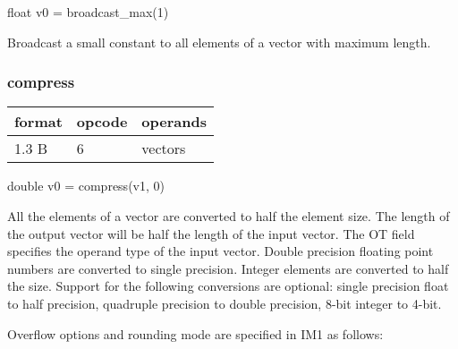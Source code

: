 \documentclass[forwardcom.tex]{subfiles}
\begin{document}
float v0 = broadcast\_max(1)
\vspace{2mm}

Broadcast a small constant to all elements of a vector with maximum length.
\vspace{2mm}


\subsubsection{compress}
\label{table:compressInstruction}
\begin{tabular}{|p{12mm}|p{12mm}|p{110mm}|}
\hline
\bfseries format & \bfseries opcode & \bfseries operands \\ \hline
1.3 B & 6 & vectors \\ \hline
\end{tabular}
\vspace{2mm}

double v0 = compress(v1, 0)
\vspace{2mm}

All the elements of a vector are converted to half the element size. The length of the output vector will be half the length of the input vector. The OT field specifies the operand type of the input vector. Double precision floating point numbers are converted to single precision. Integer elements are converted to half the size. Support for the following conversions are optional: single precision float to half precision, quadruple precision to double precision, 8-bit integer to 4-bit.
\vspace{2mm}

Overflow options and rounding mode are specified in IM1 as follows:
\end{document}
